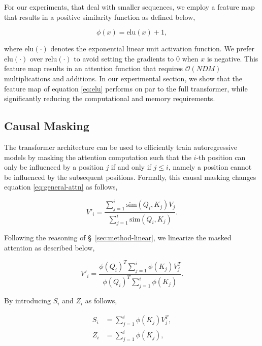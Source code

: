 For our experiments, that deal with smaller sequences, we employ a feature map that results in a positive similarity function as defined below,

\begin{equation}
    \phi\left(x\right) = \text{elu}(x) + 1, \label{eq:elu}
\end{equation}

where $\text{elu}(\cdot)$ denotes the exponential linear unit \cite{clevert2015fast} activation function. We prefer $\text{elu}(\cdot)$ over
$\text{relu}(\cdot)$ to avoid setting the gradients to 0 when $x$ is negative. This feature map results in an attention function that requires $\mathcal{O}\left(N D M\right)$
multiplications and additions. In our experimental section, we show that the feature map of equation \ref{eq:elu} performs on par to the full transformer, while significantly reducing the computational and memory requirements.

\subsection{Causal Masking} \label{sec:method-masking}

The transformer architecture can be used to efficiently train autoregressive models by masking the attention computation such that the $i$-th position can only be influenced by a position $j$ if and only if $j \leq i$, namely a position cannot be influenced by the subsequent positions. Formally, this causal masking changes equation \ref{eq:general-attn} as follows,

\begin{equation}
    V'_i = \frac{\sum_{j=1}^i \text{sim}\left(Q_i, K_j\right) V_j}
                {\sum_{j=1}^i \text{sim}\left(Q_i, K_j\right)}.
    \label{eq:masked_attn}
\end{equation}

Following the reasoning of \S~\ref{sec:method-linear}, we linearize the masked attention as described below,

\begin{equation}
    V'_i = \frac{\phi\left(Q_i\right)^T \sum_{j=1}^i \phi\left(K_j\right) V_j^T}
                 {\phi\left(Q_i\right)^T \sum_{j=1}^i \phi\left(K_j\right)}.
    \label{eq:masked_linear_attn}
\end{equation}

By introducing $S_i$ and $Z_i$ as follows,

\begin{align}
    S_i &= \sum_{j=1}^i \phi\left(K_j\right) V_j^T, \label{eq:attn_state} \\
    Z_i &= \sum_{j=1}^i \phi\left(K_j\right),
\end{align}

